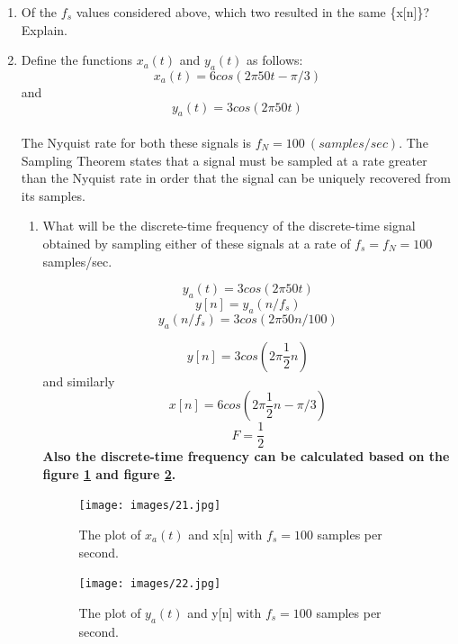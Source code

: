 \documentclass[12pt]{article}
\begin{document}
\begin{enumerate}
\item Of the $f_s$ values considered above, which two resulted in the same \{x[n]\}? Explain.



\item Define the functions $x_a(t)$ and $y_a(t)$ as follows:\\
$$x_a(t) = 6 cos(2\pi50t - \pi/3)$$ and $$y_a(t) = 3 cos(2\pi50t)$$\\
The Nyquist rate for both these signals is $f_N = 100\ (samples/sec)$. The Sampling Theorem states that a signal must be sampled at a rate greater than the Nyquist rate in order that the signal can be uniquely recovered from its samples.


\begin{enumerate}
\item What will be the discrete-time frequency of the discrete-time signal obtained by sampling either of these signals at a rate of $f_s = f_N = 100$ samples/sec.

$$y_a(t) = 3 cos(2\pi50t)$$
$$y[n] = y_a(n/f_s)$$
$$y_a(n/f_s) = 3 cos(2\pi50n/100)$$

$$y[n] = 3 cos(2\pi\frac{1}{2}n)$$
 and similarly
$$x[n] = 6 cos(2\pi\frac{1}{2}n - \pi/3)$$
\textbf{
$$\boxed{F = \frac{1}{2}}$$
}
\textbf{Also the discrete-time frequency can be calculated based on the figure \ref{fig:21} and figure \ref{fig:22}.}


\begin{figure}[H]
    \centering
    \begin{minipage}[b]{0.7\textwidth}
        \texttt{[image: images/21.jpg]}
    \end{minipage}
    \caption{The plot of $x_a(t)$ and x[n] with $f_s = 100$ samples per second.}
    \label{fig:21}
\end{figure}

\begin{figure}[H]
    \centering
    \begin{minipage}[b]{0.7\textwidth}
        \texttt{[image: images/22.jpg]}
    \end{minipage}
    \caption{The plot of $y_a(t)$ and y[n] with $f_s = 100$ samples per second.}
    \label{fig:22}
\end{figure}








\end{enumerate}
\end{enumerate}
\end{document}
